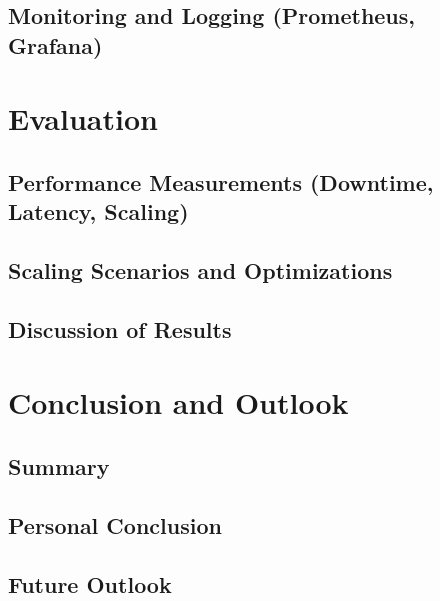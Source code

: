 \documentclass[11pt, a4paper, oneside, listof=totoc]{scrartcl}
\begin{document}
        \subsection[Monitoring and Logging]{Monitoring and Logging (Prometheus, Grafana)}\label{subsec:monitoring}

    \section{Evaluation}\label{sec:evaluation}

        \subsection[Performance Measurements]{Performance Measurements (Downtime, Latency, Scaling)}\label{subsec:performance}

        \subsection{Scaling Scenarios and Optimizations}\label{subsec:scalingOptimization}

        \subsection{Discussion of Results}\label{subsec:discussion}

    \section{Conclusion and Outlook}\label{sec:conclusion}

        \subsection{Summary}\label{subsec:summary}

        \subsection{Personal Conclusion}\label{subsec:personalConclusion}

        \subsection{Future Outlook}\label{subsec:outlook}

    \cleardoublepage
    \printbibliography[
        title = {References},
        heading = bibintoc
    ]

    \cleardoublepage
    \appendix
\end{document}
